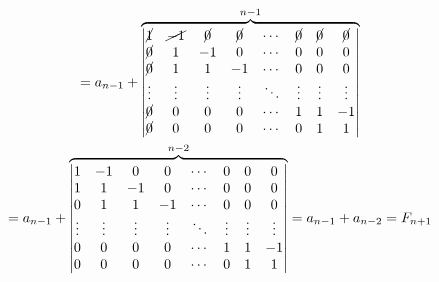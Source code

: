 \documentclass{article}
\begin{document}
\begin{multline*}
= a_{n-1} + \overbrace{\left|\begin{matrix}\cancel{1} & \cancel{-1} & \cancel{0} & \cancel{0} & \cdots & \cancel{0} & \cancel{0} & \cancel{0} \\ \cancel{0} & 1 & -1 & 0 & \cdots & 0 & 0 & 0 \\ \cancel{0} & 1 & 1 & -1 & \cdots & 0 & 0 & 0 \\ \vdots & \vdots & \vdots & \vdots & \ddots & \vdots & \vdots & \vdots \\ \cancel{0} & 0 & 0 & 0 & \cdots & 1 & 1 & -1 \\ \cancel{0} & 0 & 0 & 0 & \cdots & 0 & 1 & 1\end{matrix}\right|}^{n-1} \\
= a_{n-1} + \overbrace{\left|\begin{matrix}1 & -1 & 0 & 0 & \cdots & 0 & 0 & 0 \\ 1 & 1 & -1 & 0 & \cdots & 0 & 0 & 0 \\ 0 & 1 & 1 & -1 & \cdots & 0 & 0 & 0 \\ \vdots & \vdots & \vdots & \vdots & \ddots & \vdots & \vdots & \vdots \\ 0 & 0 & 0 & 0 & \cdots & 1 & 1 & -1 \\ 0 & 0 & 0 & 0 & \cdots & 0 & 1 & 1\end{matrix}\right|}^{n-2} = a_{n-1} + a_{n-2} = F_{n+1}
\end{multline*}
\end{document}
